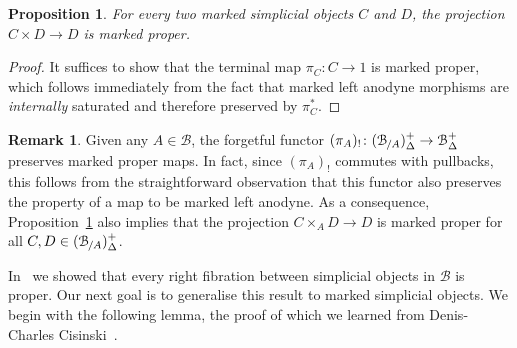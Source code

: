 \documentclass[reqno]{amsart}
\numberwithin{equation}{subsection}
\theoremstyle{plain}
\newtheorem{proposition}[equation]{Proposition}
\theoremstyle{definition}
\newtheorem{remark}[equation]{Remark}
\let\scr=\mathcal
\def\BB{\scr B}
\newcommand{\Over}[2]{#1_{\hspace{-1pt}/#2}}
\newcommand{\mSimp}[1]{#1_{\Delta}^+}
\begin{document}
\begin{proposition}
	\label{prop:projectionsAreProper}
	For every two marked simplicial objects $C$ and $D$, the projection $C\times D\to D$ is marked proper.
\end{proposition}
\begin{proof}
	It suffices to show that the terminal map $\pi_C\colon C\to 1$ is marked proper, which follows immediately from the fact that marked left anodyne morphisms are \emph{internally} saturated and therefore preserved by $\pi_C^\ast$.
\end{proof}
\begin{remark}
	\label{rem:properMapBC}
	Given any $A\in\BB$, the forgetful functor $(\pi_A)_!\colon \mSimp{(\Over{\BB}{A})}\to\mSimp\BB$ preserves marked proper maps. In fact, since $(\pi_A)_!$ commutes with pullbacks, this follows from the straightforward observation that this functor also preserves the property of a map to be marked left anodyne. As a consequence, Proposition~\ref{prop:projectionsAreProper} also implies that the projection $C\times_A D\to D$ is marked proper for all $C,D\in\mSimp{(\Over{\BB}{A})}$.
\end{remark}

In~\cite[Proposition~4.4.7]{Martini2021} we showed that every right fibration between simplicial objects in $\BB$ is proper. Our next goal is to generalise this result to marked simplicial objects. We begin with the following lemma, the proof of which we learned from Denis-Charles Cisinski~\cite[Proposition~5.3.5]{cisinski2019a}.
\end{document}
